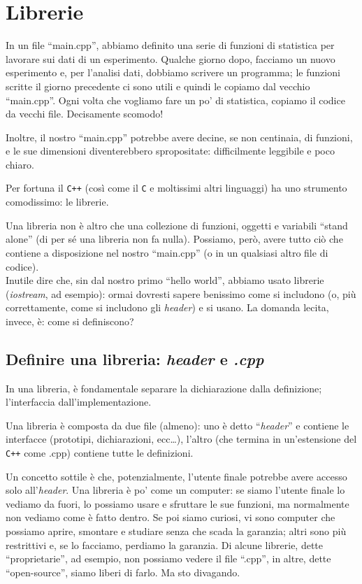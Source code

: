 \chapter{Librerie}\label{lib}
In un file ``main.cpp'', abbiamo definito una serie di funzioni di statistica per lavorare sui dati di un esperimento. Qualche giorno dopo, facciamo un nuovo esperimento e, per l'analisi dati, dobbiamo scrivere un programma; le funzioni scritte il giorno precedente ci sono utili e quindi le copiamo dal vecchio ``main.cpp''. Ogni volta che vogliamo fare un po' di statistica, copiamo il codice da vecchi file. Decisamente scomodo! 

Inoltre, il nostro ``main.cpp'' potrebbe avere decine, se non centinaia, di funzioni, e le sue dimensioni diventerebbero spropositate: difficilmente leggibile e poco chiaro.

Per fortuna il \verb|C++| (così come il \verb|C| e moltissimi altri linguaggi) ha uno strumento comodissimo: le librerie. 

Una libreria non è altro che una collezione di funzioni, oggetti e variabili ``stand alone'' (di per sé una libreria non fa nulla). Possiamo, però, avere tutto ciò che contiene a disposizione nel nostro ``main.cpp'' (o in un qualsiasi altro file di codice).\\

Inutile dire che, sin dal nostro primo ``hello world'', abbiamo usato librerie (\emph{iostream}, ad esempio): ormai dovresti sapere benissimo come si includono (o, più correttamente, come si includono gli \emph{header}) e si usano. La domanda lecita, invece, è: come si definiscono?

\section{Definire una libreria: \emph{header} e \emph{.cpp}}
In una libreria, è fondamentale separare la dichiarazione dalla definizione; l'interfaccia dall'implementazione.

Una libreria è composta da due file (almeno): uno è detto ``\emph{header}'' e contiene le interfacce (prototipi, dichiarazioni, ecc\ldots), l'altro (che termina in un'estensione del \verb|C++| come .cpp) contiene tutte le definizioni.

Un concetto sottile è che, potenzialmente, l'utente finale potrebbe avere accesso solo all'\emph{header}. Una libreria è po' come un computer: se siamo l'utente finale lo vediamo da fuori, lo possiamo usare e sfruttare le sue funzioni, ma normalmente non vediamo come è fatto dentro. Se poi siamo curiosi, vi sono computer che possiamo aprire, smontare e studiare senza che scada la garanzia; altri sono più restrittivi e, se lo facciamo, perdiamo la garanzia. Di alcune librerie, dette ``proprietarie'', ad esempio, non possiamo vedere il file ``.cpp'', in altre, dette ``open-source'', siamo liberi di farlo. Ma sto divagando.

